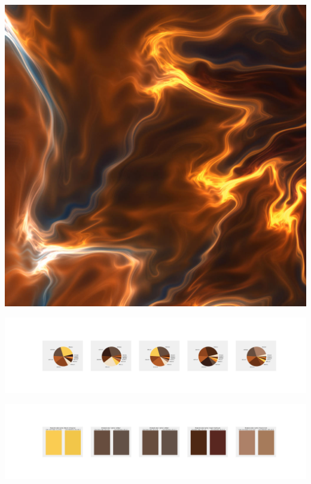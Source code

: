 \documentclass[11pt]{article}
\begin{document}
\begin{landscape}
    \begin{center}
    \includegraphics[width=\textwidth]{./nbimg/file (190).jpg}
    \end{center}

    \begin{center}
    \includegraphics[width=250mm]{./nbimg/pie-101.jpg}
    \end{center}

    \begin{center}
    \includegraphics[width=250mm]{./nbimg/peak-101.jpg}
    \end{center}
    


\end{landscape}
\end{document}
